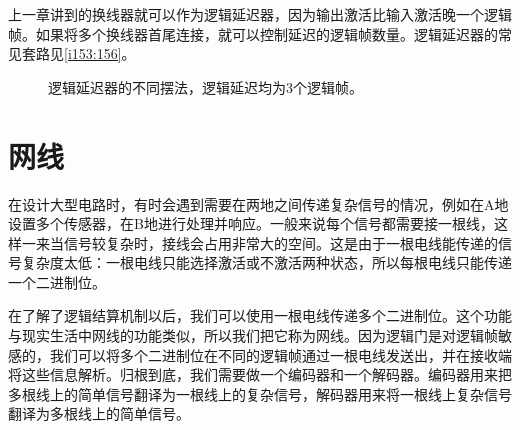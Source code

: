 上一章讲到的换线器就可以作为逻辑延迟器，因为输出激活比输入激活晚一个逻辑帧。如果将多个换线器首尾连接，就可以控制延迟的逻辑帧数量。逻辑延迟器的常见套路见\autoref{i153:156}。

\begin{figure}[!ht]
\begin{center}
\qquad
{}
\qquad
{}
\qquad
{}
\end{center}
\caption{逻辑延迟器的不同摆法，逻辑延迟均为3个逻辑帧。}
\label{i153:156}
\end{figure}

\section{网线}\label{sec17}
在设计大型电路时，有时会遇到需要在两地之间传递复杂信号的情况，例如在A地设置多个传感器，在B地进行处理并响应。一般来说每个信号都需要接一根线，这样一来当信号较复杂时，接线会占用非常大的空间。这是由于一根电线能传递的信号复杂度太低：一根电线只能选择激活或不激活两种状态，所以每根电线只能传递一个二进制位。

在了解了逻辑结算机制以后，我们可以使用一根电线传递多个二进制位。这个功能与现实生活中网线的功能类似，所以我们把它称为网线。因为逻辑门是对逻辑帧敏感的，我们可以将多个二进制位在不同的逻辑帧通过一根电线发送出，并在接收端将这些信息解析。归根到底，我们需要做一个编码器和一个解码器。编码器用来把多根线上的简单信号翻译为一根线上的复杂信号，解码器用来将一根线上复杂信号翻译为多根线上的简单信号。

